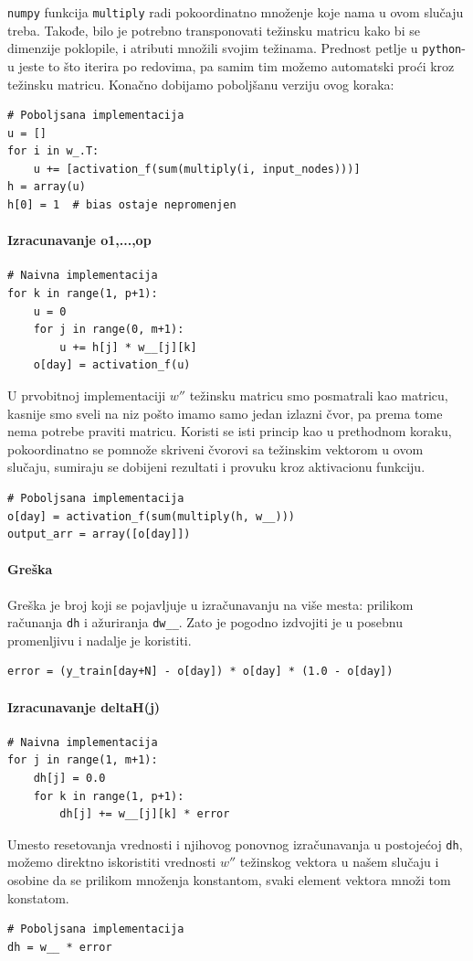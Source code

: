 \documentclass[a4paper]{article}
\begin{document}
\texttt{numpy} funkcija \texttt{multiply} radi pokoordinatno množenje koje nama u ovom slučaju treba. Takođe, bilo je potrebno transponovati težinsku matricu kako bi se dimenzije poklopile, i atributi množili svojim težinama. Prednost petlje u \texttt{python}-u jeste to što iterira po redovima, pa samim tim možemo automatski proći kroz težinsku matricu.
Konačno dobijamo poboljšanu verziju ovog koraka:
\begin{verbatim}
# Poboljsana implementacija
u = []
for i in w_.T:
    u += [activation_f(sum(multiply(i, input_nodes)))]
h = array(u)
h[0] = 1  # bias ostaje nepromenjen
\end{verbatim}

\paragraph{Izracunavanje o1,...,op}
\begin{verbatim}
# Naivna implementacija
for k in range(1, p+1):
    u = 0
    for j in range(0, m+1):
        u += h[j] * w__[j][k]
    o[day] = activation_f(u)
\end{verbatim}
U prvobitnoj implementaciji $w''$ težinsku matricu smo posmatrali kao matricu, kasnije smo sveli na niz pošto imamo samo jedan izlazni čvor, pa prema tome nema potrebe praviti matricu. Koristi se isti princip kao u prethodnom koraku, pokoordinatno se pomnože skriveni čvorovi sa težinskim vektorom u ovom slučaju, sumiraju se dobijeni rezultati i provuku kroz aktivacionu funkciju.
\begin{verbatim}
# Poboljsana implementacija
o[day] = activation_f(sum(multiply(h, w__)))
output_arr = array([o[day]])
\end{verbatim}

\paragraph{Greška}
Greška je broj koji se pojavljuje u izračunavanju na više mesta: prilikom računanja \texttt{dh} i ažuriranja \texttt{dw\_\_}. Zato je pogodno izdvojiti je u posebnu promenljivu i nadalje je koristiti.
\begin{verbatim}
error = (y_train[day+N] - o[day]) * o[day] * (1.0 - o[day])
\end{verbatim}

\paragraph{Izracunavanje deltaH(j)}
\begin{verbatim}
# Naivna implementacija
for j in range(1, m+1):
    dh[j] = 0.0
    for k in range(1, p+1):
        dh[j] += w__[j][k] * error
\end{verbatim}
Umesto resetovanja vrednosti i njihovog ponovnog izračunavanja u postojećoj \texttt{dh}, možemo direktno iskoristiti vrednosti $w''$ težinskog vektora u našem slučaju i osobine da se prilikom množenja konstantom, svaki element vektora množi tom konstatom.
\begin{verbatim}
# Poboljsana implementacija
dh = w__ * error
\end{verbatim}
\end{document}
